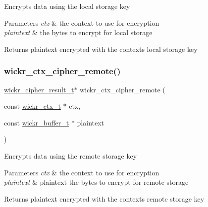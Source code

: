 Encrypts data using the local storage key


\begin{DoxyParams}{Parameters}
{\em ctx} & the context to use for encryption \\
\hline
{\em plaintext} & the bytes to encrypt for local storage \\
\hline
\end{DoxyParams}
\begin{DoxyReturn}{Returns}
\textquotesingle{}plaintext\textquotesingle{} encrypted with the context\textquotesingle{}s local storage key 
\end{DoxyReturn}
\mbox{\label{group__wickr__ctx_ga0b985fb2cd05fb482b5ed175dfd650a0}} 
\subsubsection{\texorpdfstring{wickr\+\_\+ctx\+\_\+cipher\+\_\+remote()}{wickr\_ctx\_cipher\_remote()}}
{\footnotesize\ttfamily \mbox{\hyperlink{structwickr__cipher__result}{wickr\+\_\+cipher\+\_\+result\+\_\+t}}$\ast$ wickr\+\_\+ctx\+\_\+cipher\+\_\+remote (\begin{DoxyParamCaption}\item[{const \mbox{\hyperlink{structwickr__ctx}{wickr\+\_\+ctx\+\_\+t}} $\ast$}]{ctx,  }\item[{const \mbox{\hyperlink{structwickr__buffer}{wickr\+\_\+buffer\+\_\+t}} $\ast$}]{plaintext }\end{DoxyParamCaption})}

Encrypts data using the remote storage key


\begin{DoxyParams}{Parameters}
{\em ctx} & the context to use for encryption \\
\hline
{\em plaintext} & plaintext the bytes to encrypt for remote storage \\
\hline
\end{DoxyParams}
\begin{DoxyReturn}{Returns}
\textquotesingle{}plaintext\textquotesingle{} encrypted with the context\textquotesingle{}s remote storage key 
\end{DoxyReturn}
\mbox{\label{group__wickr__ctx_gaaa74a32619fb3b382fbeeeddc425a910}} 
